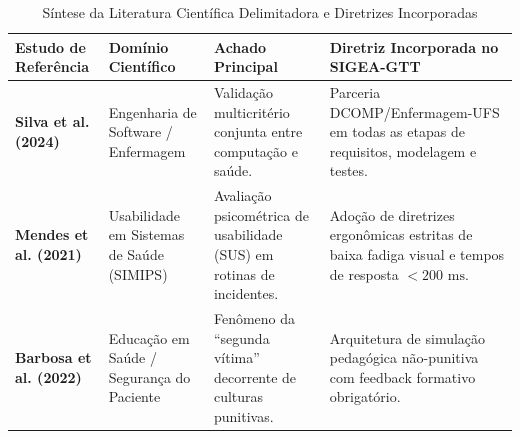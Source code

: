 \begin{table}[!ht]
\centering
\caption{Síntese da Literatura Científica Delimitadora e Diretrizes Incorporadas}
\label{tab_comparativo_literatura}
\footnotesize
\begin{tabularx}{\textwidth}{p{2.5cm} p{3.2cm} p{4.5cm} X}
\toprule
\textbf{Estudo de Referência} & \textbf{Domínio Científico} & \textbf{Achado Principal} & \textbf{Diretriz Incorporada no SIGEA-GTT} \\
\midrule
\textbf{Silva et al. (2024)} \par \cite{artigo_validacao2024} & Engenharia de Software / Enfermagem & Validação multicritério conjunta entre computação e saúde. & Parceria DCOMP/Enfermagem-UFS em todas as etapas de requisitos, modelagem e testes. \\
\addlinespace
\textbf{Mendes et al. (2021)} \par \cite{artigo_simips2021} & Usabilidade em Sistemas de Saúde (SIMIPS) & Avaliação psicométrica de usabilidade (SUS) em rotinas de incidentes. & Adoção de diretrizes ergonômicas estritas de baixa fadiga visual e tempos de resposta $< 200\text{ ms}$. \\
\addlinespace
\textbf{Barbosa et al. (2022)} \par \cite{artigo_segundavitima2022} & Educação em Saúde / Segurança do Paciente & Fenômeno da ``segunda vítima'' decorrente de culturas punitivas. & Arquitetura de simulação pedagógica não-punitiva com feedback formativo obrigatório. \\
\bottomrule
\end{tabularx}
\end{table}
